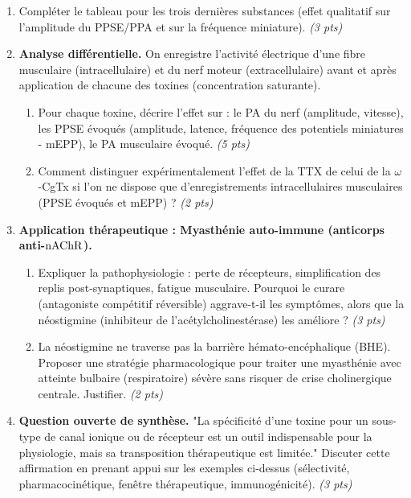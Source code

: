 \documentclass[11pt]{article}
\begin{document}
\begin{exercice}
\begin{enumerate}
    \item Compléter le tableau pour les trois dernières substances (effet qualitatif sur l'amplitude du PPSE/PPA et sur la fréquence miniature). \textit{(3 pts)}
    \item \textbf{Analyse différentielle.} On enregistre l'activité électrique d'une fibre musculaire (intracellulaire) et du nerf moteur (extracellulaire) avant et après application de chacune des toxines (concentration saturante).
    \begin{enumerate}
        \item Pour chaque toxine, décrire l'effet sur : le PA du nerf (amplitude, vitesse), les PPSE évoqués (amplitude, latence, fréquence des potentiels miniatures - mEPP), le PA musculaire évoqué. \textit{(5 pts)}
        \item Comment distinguer expérimentalement l'effet de la TTX de celui de la $\omega$-CgTx si l'on ne dispose que d'enregistrements intracellulaires musculaires (PPSE évoqués et mEPP) ? \textit{(2 pts)}
    \end{enumerate}
    \item \textbf{Application thérapeutique : Myasthénie auto-immune (anticorps anti-$\ce{nAChR}$).}
    \begin{enumerate}
        \item Expliquer la pathophysiologie : perte de récepteurs, simplification des replis post-synaptiques, fatigue musculaire. Pourquoi le curare (antagoniste compétitif réversible) aggrave-t-il les symptômes, alors que la néostigmine (inhibiteur de l'acétylcholinestérase) les améliore ? \textit{(3 pts)}
        \item La néostigmine ne traverse pas la barrière hémato-encéphalique (BHE). Proposer une stratégie pharmacologique pour traiter une myasthénie avec atteinte bulbaire (respiratoire) sévère sans risquer de crise cholinergique centrale. Justifier. \textit{(2 pts)}
    \end{enumerate}
    \item \textbf{Question ouverte de synthèse.} "La spécificité d'une toxine pour un sous-type de canal ionique ou de récepteur est un outil indispensable pour la physiologie, mais sa transposition thérapeutique est limitée." Discuter cette affirmation en prenant appui sur les exemples ci-dessus (sélectivité, pharmacocinétique, fenêtre thérapeutique, immunogénicité). \textit{(3 pts)}
\end{enumerate}
\end{exercice}
\end{document}

